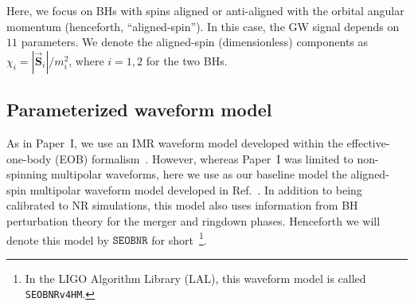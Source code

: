 \documentclass[twocolumn,prd,aps,superscriptaddress,preprintnumbers,tightenlines,showpacs,nofootinbib,eqsecnum,amsfonts,amsmath]{revtex4-1}
\newcommand{\paperone}{Paper~I\xspace}
\newcommand{\SEOB}{\texttt{SEOBNR}}
\begin{document}
Here, we focus on BHs with spins aligned or anti-aligned 
with the orbital angular momentum (henceforth, ``aligned-spin''). In this case,  
the GW signal depends on $11$ parameters. We denote the 
aligned-spin (dimensionless) components as $\chi_{i} = |\vec{\bm{S}}_i|/m^2_i$, where $i=1,2$ for the two BHs.

\subsection{Parameterized waveform model}\label{sec:model}

As in \paperone, we use an IMR waveform model developed within the effective-one-body (EOB) 
formalism~\cite{Brito:2018rfr}. However, whereas \paperone was limited to non-spinning multipolar waveforms, 
here we use as our baseline model the aligned-spin multipolar waveform model 
developed in Ref.~\citep{Cotesta:2018fcv}. In addition to being
calibrated to NR simulations, this model also uses information from BH
perturbation theory for the merger and ringdown phases. Henceforth we
will denote this model by $\SEOB$ for short~\footnote{In the LIGO Algorithm Library (LAL), this 
waveform model is called {\tt SEOBNRv4HM}.}.
\end{document}
